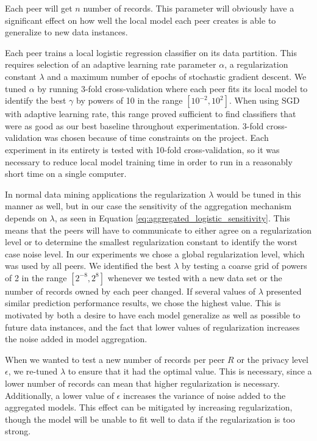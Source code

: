Each peer will get $n$ number of records. This parameter will obviously have a significant effect on how well the local model each peer creates is able to generalize to new data instances. 

Each peer trains a local logistic regression classifier on its data partition. This requires selection of an adaptive learning rate parameter $\alpha$, a regularization constant $\lambda$ and a maximum number of epochs of stochastic gradient descent. We tuned $\alpha$ by running 3-fold cross-validation where each peer fits its local model to identify the best $\gamma$ by powers of 10 in the range $[10^{-2}, 10^{2}]$. When using SGD with adaptive learning rate, this range proved sufficient to find classifiers that were as good as our best baseline throughout experimentation. 3-fold cross-validation was chosen because of time constraints on the project. Each experiment in its entirety is tested with 10-fold cross-validation, so it was necessary to reduce local model training time in order to run in a reasonably short time on a single computer.

In normal data mining applications the regularization $\lambda$ would be tuned in this manner as well, but in our case the sensitivity of the aggregation mechanism depends on $\lambda$, as seen in Equation \ref{eq:aggregated_logistic_sensitivity}. This means that the peers will have to communicate to either agree on a regularization level or to determine the smallest regularization constant to identify the worst case noise level. In our experiments we chose a global regularization level, which was used by all peers. We identified the best $\lambda$ by testing a coarse grid of powers of 2 in the range $[2^{-8}, 2^{8}]$ whenever we tested with a new data set or the number of records owned by each peer changed. If several values of $\lambda$ presented similar prediction performance results, we chose the highest value. This is motivated by both a desire to have each model generalize as well as possible to future data instances, and the fact that lower values of regularization increases the noise added in model aggregation.

When we wanted to test a new number of records per peer $R$ or the privacy level $\epsilon$, we re-tuned $\lambda$ to ensure that it had the optimal value. This is necessary, since a lower number of records can mean that higher regularization is necessary. Additionally, a lower value of $\epsilon$ increases the variance of noise added to the aggregated models. This effect can be mitigated by increasing regularization, though the model will be unable to fit well to data if the regularization is too strong.

